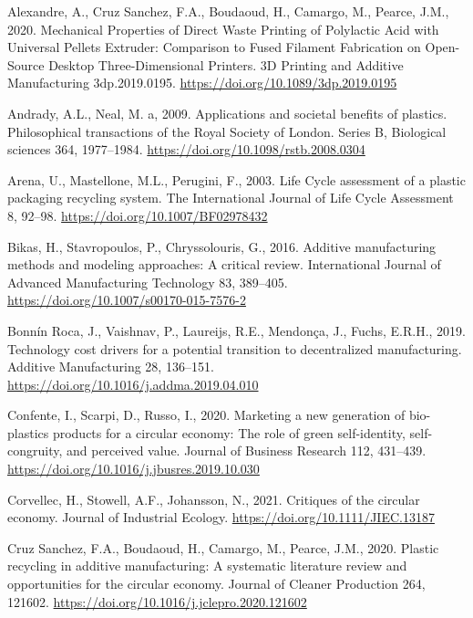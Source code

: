 \documentclass[]{elsarticle} %
\newlength{\cslhangindent}
\newlength{\cslentryspacingunit} %
\newenvironment{CSLReferences}[2] %
 {%
  \setlength{\parindent}{0pt}
  \ifodd #1
  \let\oldpar\par
  \def\par{\hangindent=\cslhangindent\oldpar}
  \fi
  \setlength{\parskip}{#2\cslentryspacingunit}
 }%
 {}
\begin{document}
\hypertarget{refs}{}
\begin{CSLReferences}{1}{0}
\leavevmode{}%
Alexandre, A., Cruz Sanchez, F.A., Boudaoud, H., Camargo, M., Pearce, J.M., 2020. Mechanical {Properties} of {Direct Waste Printing} of {Polylactic Acid} with {Universal Pellets Extruder}: {Comparison} to {Fused Filament Fabrication} on {Open-Source Desktop Three-Dimensional Printers}. 3D Printing and Additive Manufacturing 3dp.2019.0195. \url{https://doi.org/10.1089/3dp.2019.0195}

\leavevmode{}%
Andrady, A.L., Neal, M. a, 2009. Applications and societal benefits of plastics. Philosophical transactions of the Royal Society of London. Series B, Biological sciences 364, 1977--1984. \url{https://doi.org/10.1098/rstb.2008.0304}

\leavevmode{}%
Arena, U., Mastellone, M.L., Perugini, F., 2003. Life {Cycle} assessment of a plastic packaging recycling system. The International Journal of Life Cycle Assessment 8, 92--98. \url{https://doi.org/10.1007/BF02978432}

\leavevmode{}%
Bikas, H., Stavropoulos, P., Chryssolouris, G., 2016. Additive manufacturing methods and modeling approaches: {A} critical review. International Journal of Advanced Manufacturing Technology 83, 389--405. \url{https://doi.org/10.1007/s00170-015-7576-2}

\leavevmode{}%
Bonnín Roca, J., Vaishnav, P., Laureijs, R.E., Mendonça, J., Fuchs, E.R.H., 2019. Technology cost drivers for a potential transition to decentralized manufacturing. Additive Manufacturing 28, 136--151. \url{https://doi.org/10.1016/j.addma.2019.04.010}

\leavevmode{}%
Confente, I., Scarpi, D., Russo, I., 2020. Marketing a new generation of bio-plastics products for a circular economy: {The} role of green self-identity, self-congruity, and perceived value. Journal of Business Research 112, 431--439. \url{https://doi.org/10.1016/j.jbusres.2019.10.030}

\leavevmode{}%
Corvellec, H., Stowell, A.F., Johansson, N., 2021. Critiques of the circular economy. Journal of Industrial Ecology. \url{https://doi.org/10.1111/JIEC.13187}

\leavevmode{}%
Cruz Sanchez, F.A., Boudaoud, H., Camargo, M., Pearce, J.M., 2020. Plastic recycling in additive manufacturing: {A} systematic literature review and opportunities for the circular economy. Journal of Cleaner Production 264, 121602. \url{https://doi.org/10.1016/j.jclepro.2020.121602}


\end{CSLReferences}
\end{document}
